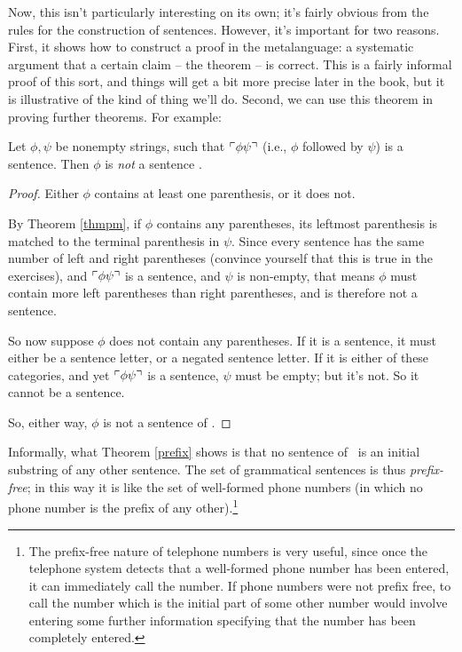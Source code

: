 Now, this isn't particularly interesting on its own; it's fairly obvious from the rules for the construction of sentences. However, it's important for two reasons. First, it shows how to construct a proof in the metalanguage: a systematic argument that a certain claim – the theorem – is correct. This is a fairly informal proof of this sort, and things will get a bit more precise later in the book, but it is illustrative of the kind of thing we'll do. Second, we can use this theorem in proving further theorems. For example: \begin{theorem}\label{prefix} Let $\phi,\psi$ be nonempty strings, such that $\ulcorner \phi\psi \urcorner$ (i.e., $\phi$ followed by $\psi$) is a sentence. Then $\phi$ is \emph{not} a sentence \citep[\S 2, Theorem 5]{sep-logic-classical}.
  	\begin{proof} Either $\phi$ contains at least one parenthesis, or it does not.

  		By Theorem \ref{thmpm}, if $\phi$ contains any parentheses, its leftmost parenthesis is matched to the terminal parenthesis in $\psi$. Since every sentence has the same number of left and right parentheses (convince yourself that this is true in the exercises), and $\ulcorner \phi\psi \urcorner$ is a sentence, and $\psi$ is non-empty, that means $\phi$ must contain more left parentheses than right parentheses, and is therefore not a sentence. 

  		So now suppose $\phi$ does not contain any parentheses. If it is a sentence, it must either be a sentence letter, or a negated sentence letter. If it is either of these categories, and yet $\ulcorner \phi\psi \urcorner$ is a sentence, $\psi$ must be empty; but it's not. So it cannot be a sentence.

  		So, either way, $\phi$ is not a sentence of \lone. 
  	\end{proof}
  \end{theorem}
Informally, what Theorem \ref{prefix} shows is that no sentence of \lone\ is an initial substring of any other sentence. The set of grammatical sentences is thus \emph{prefix-free}; in this way it is like the set of well-formed phone numbers (in which no phone number is the prefix of any other).\footnote{The prefix-free nature of telephone numbers is very useful, since once the telephone system detects that a well-formed phone number has been entered, it can immediately call the number. If phone numbers were not prefix free, to call the number which is the initial part of some other number would involve entering some further information specifying that the number has been completely entered.}

